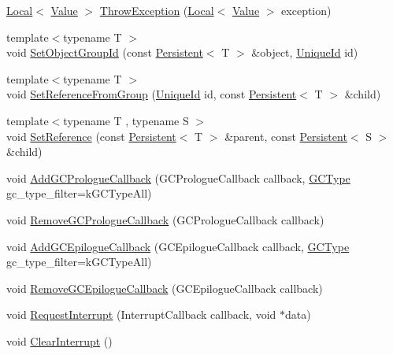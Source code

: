 \begin{DoxyCompactItemize}
\item 
\hyperlink{classv8_1_1Local}{Local}$<$ \hyperlink{classv8_1_1Value}{Value} $>$ \hyperlink{classv8_1_1Isolate_aba648b3c00dc9f1ef2a22195d99e22e8}{Throw\-Exception} (\hyperlink{classv8_1_1Local}{Local}$<$ \hyperlink{classv8_1_1Value}{Value} $>$ exception)
\item 
{\footnotesize template$<$typename T $>$ }\\void \hyperlink{classv8_1_1Isolate_ae4418cb238686a321aa406e90c72fab5}{Set\-Object\-Group\-Id} (const \hyperlink{classv8_1_1Persistent}{Persistent}$<$ T $>$ \&object, \hyperlink{classv8_1_1UniqueId}{Unique\-Id} id)
\item 
{\footnotesize template$<$typename T $>$ }\\void \hyperlink{classv8_1_1Isolate_a0f8484db111e967d70ea7551b3593ce6}{Set\-Reference\-From\-Group} (\hyperlink{classv8_1_1UniqueId}{Unique\-Id} id, const \hyperlink{classv8_1_1Persistent}{Persistent}$<$ T $>$ \&child)
\item 
{\footnotesize template$<$typename T , typename S $>$ }\\void \hyperlink{classv8_1_1Isolate_a055fc73d18747b96c51f00599cdd3ec1}{Set\-Reference} (const \hyperlink{classv8_1_1Persistent}{Persistent}$<$ T $>$ \&parent, const \hyperlink{classv8_1_1Persistent}{Persistent}$<$ S $>$ \&child)
\item 
void \hyperlink{classv8_1_1Isolate_ac5614f2eae055c949927bc8daddf90c3}{Add\-G\-C\-Prologue\-Callback} (G\-C\-Prologue\-Callback callback, \hyperlink{namespacev8_ac109d6f27e0c0f9ef4e98bcf7a806cf2}{G\-C\-Type} gc\-\_\-type\-\_\-filter=k\-G\-C\-Type\-All)
\item 
void \hyperlink{classv8_1_1Isolate_a7902b8b58f3c85bac9b7dd1086fa81ce}{Remove\-G\-C\-Prologue\-Callback} (G\-C\-Prologue\-Callback callback)
\item 
void \hyperlink{classv8_1_1Isolate_add9cac1ffd6cb1b7ed6b0956cebae129}{Add\-G\-C\-Epilogue\-Callback} (G\-C\-Epilogue\-Callback callback, \hyperlink{namespacev8_ac109d6f27e0c0f9ef4e98bcf7a806cf2}{G\-C\-Type} gc\-\_\-type\-\_\-filter=k\-G\-C\-Type\-All)
\item 
void \hyperlink{classv8_1_1Isolate_a277144482f5fefd58d822c22a173b01a}{Remove\-G\-C\-Epilogue\-Callback} (G\-C\-Epilogue\-Callback callback)
\item 
void \hyperlink{classv8_1_1Isolate_a971b6094ecc6c7f55eb6f58a71a8afd3}{Request\-Interrupt} (Interrupt\-Callback callback, void $\ast$data)
\item 
void \hyperlink{classv8_1_1Isolate_a00790d743cec68bbaa8ca7dbf6257f05}{Clear\-Interrupt} ()

\end{DoxyCompactItemize}
